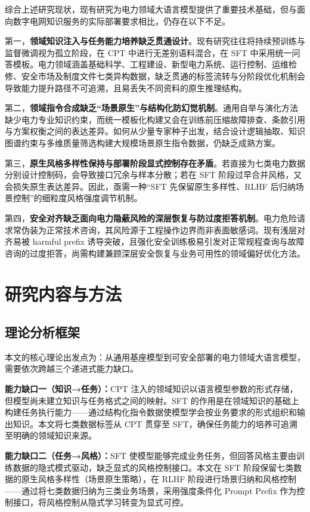\documentclass[fontset=fandol,type=master,campus=shenzhen,etitleauto=true]{hithesisbook}
\begin{document}
综合上述研究现状，现有研究为电力领域大语言模型提供了重要技术基础，但与面向数字电网知识服务的实际部署要求相比，仍存在以下不足。

第一，\textbf{领域知识注入与任务能力培养缺乏贯通设计}。现有研究往往将持续预训练与监督微调视为孤立阶段，在 CPT 中进行无差别语料混合，在 SFT 中采用统一问答模板。电力领域涵盖基础科学、工程建设、新型电力系统、运行控制、运维检修、安全市场及制度文件七类异构数据，缺乏贯通的标签流转与分阶段优化机制会导致能力提升路径不可追溯，且易丢失不同资料的原生推理结构。

第二，\textbf{领域指令合成缺乏“场景原生”与结构化防幻觉机制}。通用自举与演化方法缺少电力专业知识约束，而统一模板化构建又会在训练前压缩故障排查、条款引用与方案权衡之间的表达差异。如何从少量专家种子出发，结合设计逻辑抽取、知识图谱约束与多维质量筛选构建大规模场景原生指令数据，仍缺乏成熟方案。

第三，\textbf{原生风格多样性保持与部署阶段显式控制存在矛盾}。若直接为七类电力数据分别设计控制码，会导致接口冗余与样本分散；若在 SFT 阶段过早合并风格，又会损失原生表达差异。因此，亟需一种“SFT 先保留原生多样性、RLHF 后归纳场景控制”的细粒度风格强度调节机制。

第四，\textbf{安全对齐缺乏面向电力隐蔽风险的深层恢复与防过度拒答机制}。电力危险请求常伪装为正常技术咨询，其风险源于工程操作边界而非表面敏感词。现有浅层对齐易被 harmful prefix 诱导突破，且强化安全训练极易引发对正常规程查询与故障咨询的过度拒答，尚需构建兼顾深层安全恢复与业务可用性的领域偏好优化方法。


\section{研究内容与方法}\label{ux7814ux7a76ux5185ux5bb9ux4e0eux65b9ux6cd5}

\subsection{理论分析框架}

本文的核心理论出发点为：从通用基座模型到可安全部署的电力领域大语言模型，需要依次跨越三个递进式能力缺口。

\textbf{能力缺口一（知识→任务）：}CPT 注入的领域知识以语言模型参数的形式存储，但模型尚未建立知识与任务格式之间的映射。SFT 的作用是在领域知识的基础上构建任务执行能力——通过结构化指令数据使模型学会按业务要求的形式组织和输出知识。本文将七类数据标签从 CPT 贯穿至 SFT，确保任务能力的培养可追溯至明确的领域知识来源。

\textbf{能力缺口二（任务→风格）：}SFT 使模型能够完成业务任务，但回答风格主要由训练数据的隐式模式驱动，缺乏显式的风格控制接口。本文在 SFT 阶段保留七类数据的原生风格多样性（场景原生策略），在 RLHF 阶段进行场景归纳和风格控制——通过将七类数据归纳为三类业务场景，采用强度条件化 Prompt Prefix 作为控制接口，将风格控制从隐式学习转变为显式可控。
\end{document}
